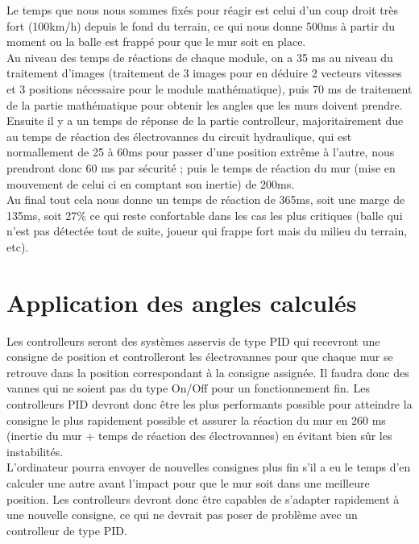 Le temps que nous nous sommes fixés pour réagir est celui d'un coup droit très fort (100km/h) depuis le fond du terrain, ce qui nous donne 500ms à partir du moment ou la balle est frappé pour que le mur soit en place. \\
Au niveau des temps de réactions de chaque module, on a 35 ms au niveau du traitement d'images (traitement de 3 images pour en déduire 2 vecteurs vitesses et 3 positions nécessaire pour le module mathématique), puis 70 ms de traitement de la partie mathématique pour obtenir les angles que les murs doivent prendre. Ensuite il y a un temps de réponse de la partie controlleur, majoritairement due au temps de réaction des électrovannes du circuit hydraulique, qui est normallement de 25 à 60ms pour passer d'une position extrême à l'autre, nous prendront donc 60 ms par sécurité ; puis le temps de réaction du mur (mise en mouvement de celui ci en comptant son inertie) de 200ms.\\
Au final tout cela nous donne un temps de réaction de 365ms, soit une marge de 135ms, soit 27\% ce qui reste confortable dans les cas les plus critiques (balle qui n'est pas détectée tout de suite, joueur qui frappe fort mais du milieu du terrain, etc).

\section{Application des angles calculés}

Les controlleurs seront des systèmes asservis de type PID qui recevront une consigne de position et controlleront les électrovannes pour que chaque mur se retrouve dans la position correspondant à la consigne assignée. Il faudra donc des vannes qui ne soient pas du type On/Off pour un fonctionnement fin. Les controlleurs PID devront donc être les plus performants possible pour atteindre la consigne le plus rapidement possible et assurer la réaction du mur en 260 ms (inertie du mur + temps de réaction des électrovannes) en évitant bien sûr les instabilités.\\
L'ordinateur pourra envoyer de nouvelles consignes plus fin s'il a eu le temps d'en calculer une autre avant l'impact pour que le mur soit dans une meilleure position. Les controlleurs devront donc être capables de s'adapter rapidement à une nouvelle consigne, ce qui ne devrait pas poser de problème avec un controlleur de type PID.

